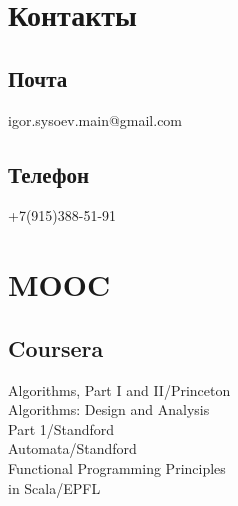 \documentclass[a4paper]{curricula-vitae}
\begin{document}



\begin{minipage}[t]{0.33\textwidth} %

\section{Контакты} 

\subsection{Почта}
igor.sysoev.main@gmail.com

\insertspace

\subsection{Телефон}
+7(915)388-51-91


\insertspace

\section{MOOC}

\subsection{Coursera}
Algorithms, Part I and II/Princeton \\
Algorithms: Design and Analysis \\
Part 1/Standford \\
Automata/Standford \\
Functional Programming Principles \\
in Scala/EPFL


\end{minipage}
\end{document}
